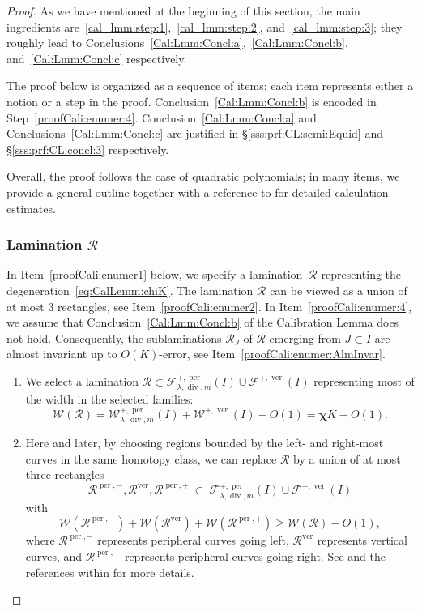 \documentclass{amsart}
\newcommand{\1}{{\mathbb 1 }}
\renewcommand{\div}{{\operatorname{div}}}
\newcommand{\Fam}{{\mathcal F}}
\newcommand{\Width}{{\mathcal W}}
\newcommand\RR{\mathcal{R}}
\newcommand\ver{{\operatorname{ver}}}
\newcommand\per{{\operatorname{per}}}
\theoremstyle{remark}
\numberwithin{equation}{section}
\theoremstyle{definition}
\newcommand{\bchi}{{\boldsymbol{ \chi}}}
\begin{document}
\begin{proof} As we have mentioned at the beginning of this section, the main ingredients are~\ref{cal_lmm:step:1},~\ref{cal_lmm:step:2}, and~\ref{cal_lmm:step:3}; they roughly lead to Conclusions~\ref{Cal:Lmm:Concl:a},~\ref{Cal:Lmm:Concl:b}, and~\ref{Cal:Lmm:Concl:c} respectively.


The proof below is organized as a sequence of items; each item represents either a notion or a step in the proof. Conclusion~\ref {Cal:Lmm:Concl:b} is encoded in Step~\ref{proofCali:enumer:4}.  Conclusion~\ref {Cal:Lmm:Concl:a} and Conclusions~\ref {Cal:Lmm:Concl:c} are justified in \S\ref{sss:prf:CL:semi:Equid}  and \S\ref{sss:prf:CL:concl:3} respectively.

Overall, the proof follows the case of quadratic polynomials; in many items, we provide a general outline together with a reference to \cite[\S 9]{DL22} for detailed calculation estimates.


\subsubsection{Lamination $\RR$}\label{sss:prf:CL} In Item~\ref{proofCali:enumer1} below, we specify a lamination~$\RR$ representing the degeneration~\eqref{eq:CalLemm:chiK}. The lamination $\RR$ can be viewed as a union of at most $3$ rectangles, see Item~\ref{proofCali:enumer2}.   In Item~\ref{proofCali:enumer:4}, we assume that Conclusion~\ref{Cal:Lmm:Concl:b} of the Calibration Lemma does not hold. Consequently, the sublaminations $\RR_J$ of $\RR$ emerging from $J\subset I$ are almost invariant up to $O(K)$-error, see Item~\ref{proofCali:enumer:AlmInvar}. 




\begin{enumerate}[label=\text{(\arabic*)},font=\normalfont,leftmargin=*]
     \item\label{proofCali:enumer1} We select a lamination $\RR \subset \Fam^{+,\per}_{\lambda, \div,m}(I)\cup \Fam^{+,\ver}(I)$ representing most of the width in the selected families:
    \[\Width(\RR)=\Width^{+,\per}_{\lambda, \div,m}(I)+\Width^{+,\ver}(I)- O(1)=\bchi K  -O(1) .\]

    \item\label{proofCali:enumer2} Here and later, by choosing regions bounded by the left- and right-most curves in the same homotopy class, we can replace $\RR$ by a union of at most three rectangles \[\RR^{\per,-}, \RR^\ver, \RR^{\per,+}\ \subset \ \Fam^{+,\per}_{\lambda, \div,m}(I)\cup \Fam^{+,\ver}(I)\] with
   \begin{equation}
       \label{eq:proofCali:enumer2} \Width(\RR^{\per,-})+\Width(\RR^{\ver})+ \Width(\RR^{\per,+})\ge \Width(\RR) -O(1),
   \end{equation} 
    where $\RR^{\per,-}$ represents peripheral curves going left, $\RR^{\ver}$ represents vertical curves, and $\RR^{\per,+}$ represents peripheral curves going right. See \cite[A.1.8]{DL22} and the references within for more details. 


\end{enumerate}
\end{proof}
\end{document}
